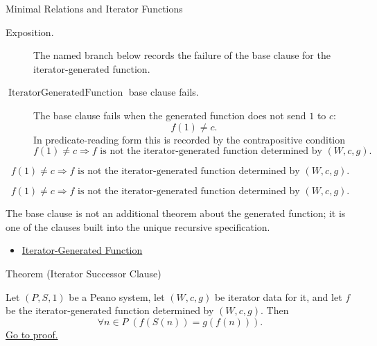 \begin{topicbox}{Minimal Relations and Iterator Functions}
\begin{remark*}
\begin{description}
  \item[Exposition.] The named branch below records the failure of the base
  clause for the iterator-generated function.
  \item[\(\operatorname{IteratorGeneratedFunction}\) base clause fails.] The
  base clause fails when the generated function does not send \(1\) to \(c\):
  \[
  f(1)\neq c.
  \]
  In predicate-reading form this is recorded by the contrapositive condition
  \[
  f(1)\neq c
  \Longrightarrow
  f \text{ is not the iterator-generated function determined by } (W,c,g).
  \]
\end{description}
\end{remark*}

\begin{remark*}
\[
f(1)\neq c
\Longrightarrow
f \text{ is not the iterator-generated function determined by } (W,c,g).
\]
\end{remark*}

\begin{remark*}
\[
f(1)\neq c
\Longrightarrow
f \text{ is not the iterator-generated function determined by } (W,c,g).
\]
\end{remark*}

\begin{remark*}[Interpretation]
The base clause is not an additional theorem about the generated function; it
is one of the clauses built into the unique recursive specification.
\end{remark*}

\begin{dependencies}
\begin{itemize}
  \item \hyperref[def:iterator-generated-function]{Iterator-Generated Function}
\end{itemize}
\end{dependencies}

\begin{theorembox}{Theorem (Iterator Successor Clause)}
\begin{theorem}
\label{thm:iterator-successor-step}
Let $(P,S,1)$ be a Peano system, let $(W,c,g)$ be iterator data for it, and let
$f$ be the iterator-generated function determined by $(W,c,g)$. Then
\[
\forall n\in P\;(f(S(n))=g(f(n))).
\]
\hyperref[prf:iterator-successor-step]{Go to proof.}
\end{theorem}
\end{theorembox}


\end{topicbox}
